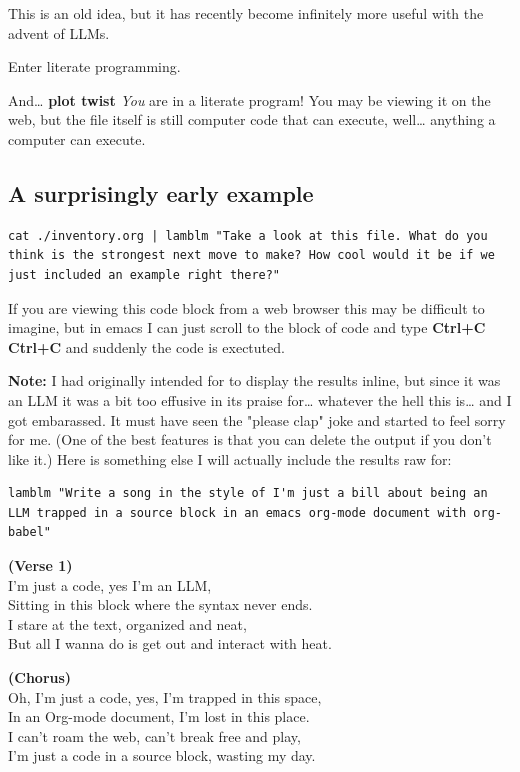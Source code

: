\documentclass[11pt]{article}
\begin{document}
This is an old idea, but it has recently become infinitely more useful with the advent of LLMs.  

Enter literate programming.

And\ldots{} \textbf{plot twist} \emph{You} are in a literate program! You may be viewing it on the web, but the file itself is still computer code that can execute, well\ldots{} anything a computer can execute.
\subsection{A surprisingly early example}
\label{sec:org19a9db9}

\begin{verbatim}
cat ./inventory.org | lamblm "Take a look at this file. What do you think is the strongest next move to make? How cool would it be if we just included an example right there?" 
\end{verbatim}

If you are viewing this code block from a web browser this may be difficult to imagine, but in emacs I can just scroll to the block of code and type \textbf{Ctrl+C Ctrl+C} and suddenly the code is exectuted.

\textbf{Note:} I had originally intended for to display the results inline, but since it was an LLM it was a bit too effusive in its praise for\ldots{} whatever the hell this is\ldots{} and I got embarassed. It must have seen the "please clap" joke and started to feel sorry for me. (One of the best features is that you can delete the output if you don't like it.) Here is something else I will actually include the results raw for:

\begin{verbatim}
lamblm "Write a song in the style of I'm just a bill about being an LLM trapped in a source block in an emacs org-mode document with org-babel" 
\end{verbatim}
\textbf{(Verse 1)}\\
I'm just a code, yes I'm an LLM,\\
Sitting in this block where the syntax never ends.\\
I stare at the text, organized and neat,\\
But all I wanna do is get out and interact with heat.

\textbf{(Chorus)}\\
Oh, I'm just a code, yes, I'm trapped in this space,\\
In an Org-mode document, I'm lost in this place.\\
I can't roam the web, can't break free and play,\\
I'm just a code in a source block, wasting my day.
\end{document}
